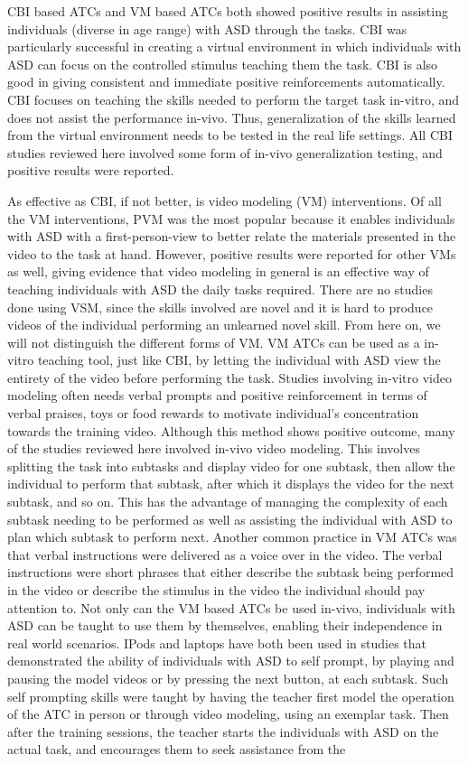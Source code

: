 \documentclass{ut-thesis}
\begin{document}
CBI based ATCs and VM based ATCs both showed positive results in assisting individuals (diverse in age range) with ASD through the tasks.  CBI was particularly successful in creating a virtual environment in which individuals with ASD can focus on the controlled stimulus teaching them the task.  CBI is also good in giving consistent and immediate positive reinforcements automatically.  CBI focuses on teaching the skills needed to perform the target task in-vitro, and does not assist the performance in-vivo.  Thus, generalization of the skills learned from the virtual environment needs to be tested in the real life settings.  All CBI studies reviewed here involved some form of in-vivo generalization testing, and positive results were reported.

As effective as CBI, if not better, is video modeling (VM) interventions.  Of all the VM interventions, PVM was the most popular because it enables individuals with ASD with a first-person-view to better relate the materials presented in the video to the task at hand. However, positive results were reported for other VMs as well, giving evidence that video modeling in general is an effective way of teaching individuals with ASD the daily tasks required. There are no studies done using VSM, since the skills involved are novel and it is hard to produce videos of the individual performing an unlearned novel skill. From here on, we will not distinguish the different forms of VM. VM ATCs can be used as a in-vitro teaching tool, just like CBI, by letting the individual with ASD view the entirety of the video before performing the task. Studies involving in-vitro video modeling often needs verbal prompts and positive reinforcement in terms of verbal praises, toys or food rewards to motivate individual's concentration towards the training video. Although this method shows positive outcome, many of the studies reviewed here involved in-vivo video modeling.  This involves splitting the task into subtasks and display video for one subtask, then allow the individual to perform that subtask, after which it displays the video for the next subtask, and so on. This has the advantage of managing the complexity of each subtask needing to be performed as well as assisting the individual with ASD to plan which subtask to perform next.  Another common practice in VM ATCs was that verbal instructions were delivered as a voice over in the video.  The verbal instructions were short phrases that either describe the subtask being performed in the video or describe the stimulus in the video the individual should pay attention to.  Not only can the VM based ATCs be used in-vivo, individuals with ASD can be taught to use them by themselves, enabling their independence in real world scenarios.  IPods and laptops have both been used in studies that demonstrated the ability of individuals with ASD to self prompt, by playing and pausing the model videos or by pressing the next button, at each subtask.  Such self prompting skills were taught by having the teacher first model the operation of the ATC in person or through video modeling, using an exemplar task.  Then after the training sessions, the teacher starts the individuals with ASD on the actual task, and encourages them to seek assistance from the 
\end{document}
